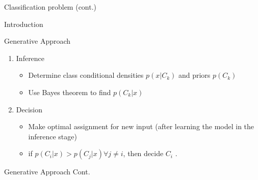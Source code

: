 \documentclass[serif, aspectratio=169]{beamer}
\begin{document}
\begin{frame}{Classification problem (cont.)}
\begin{itemize}
\begin{frame}{Introduction}
\begin{itemize}
\begin{frame}{Generative Approach}
    \begin{enumerate}
        \item Inference
        \begin{itemize}
            \item Determine class conditional densities $p(x|C_k)$ and priors $p(C_k)$
            \item Use Bayes theorem to find $p(C_k|x)$
        \end{itemize}
        \item Decision
        \begin{itemize}
            \item Make optimal assignment for new input (after learning the model in the inference stage)
            \item if $p(C_i|x) > p(C_j|x) \forall j \neq i$, then decide $C_i$ .
        \end{itemize}
    \end{enumerate}
\end{frame}

\begin{frame}{Generative Approach Cont.}


\end{frame}
\end{itemize}
\end{frame}
\end{itemize}
\end{frame}
\end{document}
